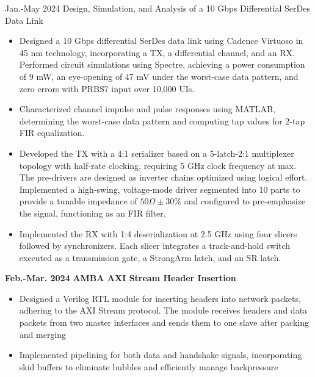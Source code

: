 \documentclass[11pt,a4paper,sans]{moderncv}
\begin{document}
\cventry
{Jan.-May 2024}
{Design, Simulation, and Analysis of a 10 Gbps Differential SerDes Data Link}
{}{}{}
{
    \begin{itemize}
        \item Designed a 10 Gbps differential SerDes data link using Cadence Virtuoso in 45 nm technology, incorporating a TX, a differential channel, and an RX. Performed circuit simulations using Spectre, achieving a power consumption of 9 mW, an eye-opening of 47 mV under the worst-case data pattern, and zero errors with PRBS7 input over 10,000 UIs.
        \item Characterized channel impulse and pulse responses using MATLAB, determining the worst-case data pattern and computing tap values for 2-tap FIR equalization.
        \item Developed the TX with a 4:1 serializer based on a 5-latch-2:1 multiplexer topology with half-rate clocking, requiring 5 GHz clock frequency at max. The pre-drivers are designed as inverter chains optimized using logical effort. Implemented a high-swing, voltage-mode driver segmented into 10 parts to provide a tunable impedance of $50 \Omega \pm 30\%$ and configured to pre-emphasize the signal, functioning as an FIR filter.
        \item Implemented the RX with 1:4 deserialization at 2.5 GHz using four slicers followed by synchronizers. Each slicer integrates a track-and-hold switch executed as a transmission gate, a StrongArm latch, and an SR latch.
    \end{itemize}
}


\cventry
{\textnormal{\textbf{Feb.-Mar. 2024}}}
{\textnormal{\textbf{AMBA AXI Stream Header Insertion}}}
{}{}{}
{
    \begin{itemize}
        \item Designed a Verilog RTL module for inserting headers into network packets, adhering to the AXI Stream protocol. The module receives headers and data packets from two master interfaces and sends them to one slave after packing and merging
        \item Implemented pipelining for both data and handshake signals, incorporating skid buffers to eliminate bubbles and efficiently manage backpressure
    \end{itemize}
}
\end{document}
